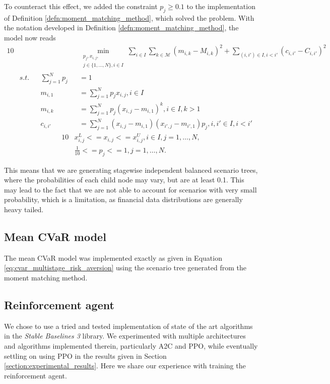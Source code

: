 To counteract this effect, we added the constraint $p_j \geq 0.1$ to the implementation of Definition \ref{defn:moment_matching_method}, which solved the problem. With the notation developed in Definition \ref{defn:moment_matching_method}, the model now reads
\begin{alignat}{10}
& && && \underset{\substack{p_j, x_{i,j}, \\ j \in \{1,...,N\}, i \in I}}{\min} \sum_{i\in I} \sum_{k\in \mathcal{M}} \left(m_{i,k} - M_{i,k}\right)^2 + \sum_{(i, i') \in I, i < i'}(c_{i,i'}-C_{i,i'})^2 \nonumber \\
& s.t. && \sum_{j=1}^N p_j&&=1 \nonumber \\
& && m_{i,1}&&=\sum_{j=1}^N p_jx_{i,j}, i \in I \nonumber \\
& && m_{i,k}&&=\sum_{j=1}^N p_j(x_{i,j}-m_{i,1})^k, i \in I, k>1 \nonumber \\
& && c_{i,i'}&&=\sum_{j=1}^N(x_{i,j}-m_{i,1})(x_{i',j}-m_{i',1})p_j, i,i' \in I, i<i' \nonumber
\end{alignat}
\vspace{-0.5cm}
\begin{alignat}{10}
& x_{i,j}^L<=x_{i,j}<=x_{i,j}^U, i \in I, j=1,\dots,N, \nonumber \\
& \frac{1}{10} <= p_j <= 1, j=1,\dots,N. \nonumber
\end{alignat}

This means that we are generating stagewise independent balanced scenario trees, where the probabilities of each child node may vary, but are at least 0.1. This may lead to the fact that we are not able to account for scenarios with very small probability, which is a limitation, as financial data distributions are generally heavy tailed.


\subsection{Mean CVaR model}
The mean CVaR model was implemented exactly as given in Equation \ref{eq:cvar_multistage_risk_aversion} using the scenario tree generated from the moment matching method.

\subsection{Reinforcement agent}
We chose to use a tried and tested implementation of state of the art algorithms in the \textit{Stable Baselines 3} \cite{stable_baselines3} library. We experimented with multiple architectures and algorithms implemented therein, particularly A2C and PPO, while eventually settling on using PPO in the results given in Section \ref{section:experimental_results}. Here we share our experience with training the reinforcement agent.

